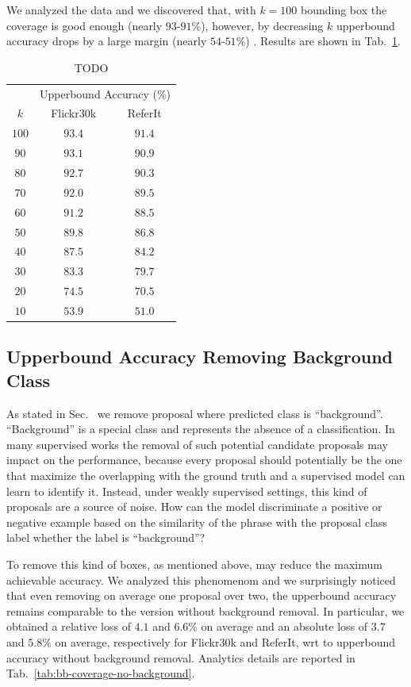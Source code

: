 We analyzed the data and we discovered that, with $k = 100$ bounding
box the coverage is good enough (nearly $93$-$91$\%), however, by
decreasing $k$ upperbound accuracy drops by a large margin (nearly
$54$-$51$\%) . Results are shown in Tab.~\ref{tab:bb-coverage}.

\begin{table}
  \centering
  \begin{tabular}{c|cc}
     & \multicolumn{2}{c}{Upperbound Accuracy (\%)} \\
    $k$ & Flickr30k & ReferIt \\\hline 
    $100$ & $93.4$ & $91.4$ \\ 
     $90$ & $93.1$ & $90.9$ \\  
     $80$ & $92.7$ & $90.3$ \\
     $70$ & $92.0$ & $89.5$ \\
     $60$ & $91.2$ & $88.5$ \\
     $50$ & $89.8$ & $86.8$ \\
     $40$ & $87.5$ & $84.2$ \\
     $30$ & $83.3$ & $79.7$ \\
     $20$ & $74.5$ & $70.5$ \\
     $10$ & $53.9$ & $51.0$ \\\hline
  \end{tabular}
  \caption[TODO]{TODO}
  \label{tab:bb-coverage}
\end{table}

\subsection{Upperbound Accuracy Removing Background Class}

As stated in Sec.~ we remove proposal where
predicted class is ``background''. ``Background'' is a special class
and represents the absence of a classification. In many supervised
works the removal of such potential candidate proposals may impact on
the performance, because every proposal should potentially be the one
that maximize the overlapping with the ground truth and a supervised
model can learn to identify it. Instead, under weakly supervised
settings, this kind of proposals are a source of noise. How can the
model discriminate a positive or negative example based on the
similarity of the phrase with the proposal class label whether the
label is ``background''?

To remove this kind of boxes, as mentioned above, may reduce the
maximum achievable accuracy. We analyzed this phenomenom and we
surprisingly noticed that even removing on average one proposal over
two, the upperbound accuracy remains comparable to the version without
background removal. In particular, we obtained a relative loss of
$4.1$ and $6.6$\% on average and an absolute loss of $3.7$ and $5.8$\%
on average, respectively for Flickr30k and ReferIt, wrt to upperbound
accuracy without background removal. Analytics details are reported in
Tab.~\ref{tab:bb-coverage-no-background}.

